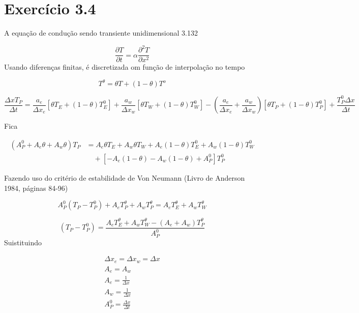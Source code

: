 \documentclass[]{article}
\begin{document}
\section*{Exercício 3.4}

A equação de condução sendo transiente unidimensional 3.132

\begin{equation}
	\frac{\partial T}{\partial t} = \alpha\frac{\partial^{2} T}{\partial x^{2}}
\end{equation}
Usando diferenças finitas, é discretizada om função de interpolação no tempo
	
\begin{equation}
	T^\theta = \theta T + (1 - \theta) T^o
\end{equation}

\begin{equation}
	\frac{\Delta x T_P}{\Delta t} =
	\frac{a_e}{\Delta x_e} \left[ \theta T_E + (1 - \theta) T_E^0 \right] +
	\frac{a_w}{\Delta x_w} \left[ \theta T_W + (1 - \theta) T_W^0 \right] -
	\left( \frac{a_e}{\Delta x_e} + \frac{a_w}{\Delta x_w} \right) \left[ \theta T_P + (1 - \theta) T_P^0 \right] +
	\frac{T_P^0 \Delta x}{\Delta t}
\end{equation}


Fica

\begin{align*}
	\left( A_P^0 + A_e \theta + A_w \theta \right) T_P &=
	A_e \theta T_E + A_w \theta T_W + A_e (1 - \theta) T_E^0 + A_w (1 - \theta) T_W^0 \\
	&\quad + \left[ -A_e (1 - \theta) - A_w (1 - \theta) + A_P^0 \right] T_P^0
\end{align*}


Fazendo uso do critério de estabilidade de Von Neumann (Livro de Anderson 1984, páginas 84-96)

\begin{equation}
	A_P^0 (T_P - T_P^0) + A_e T_P^\theta + A_w T_P^\theta = A_e T_E^\theta + A_w T_W^\theta
\end{equation}

\begin{equation}
	(T_P - T_P^0) = \frac{A_e T_E^\theta + A_w T_W^\theta - (A_e + A_w) T_P^\theta}{A_P^0}
\end{equation}
Suistituindo

\begin{align*}
	\Delta x_e = \Delta x_w = \Delta x \\ A_e = A_w  \\
	A_e = \frac{1}{\Delta x} \\
	A_w = \frac{1}{\Delta x} \\
	A_P^0 = \frac{\Delta x}{\Delta t}
\end{align*}
\end{document}
